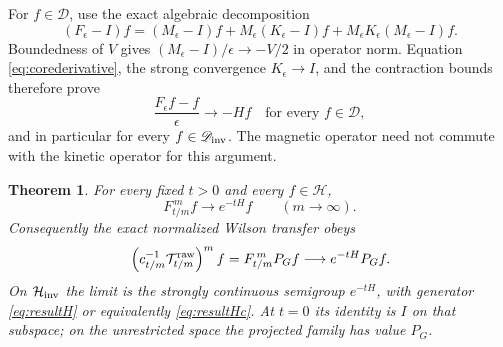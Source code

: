 \documentclass[11pt]{article}
\newtheorem{theorem}{Theorem}
\begin{document}
For $f\in\mathscr D$, use the exact algebraic decomposition
\[
 (F_\epsilon-I)f=(M_\epsilon-I)f
    +M_\epsilon(K_\epsilon-I)f
    +M_\epsilon K_\epsilon(M_\epsilon-I)f.
\]
Boundedness of $V$ gives
$(M_\epsilon-I)/\epsilon\to-V/2$ in operator norm. Equation
\eqref{eq:corederivative}, the strong convergence $K_\epsilon\to I$,
and the contraction bounds therefore prove
\begin{equation}\label{eq:Fderivative}
 \frac{F_\epsilon f-f}{\epsilon}\longrightarrow-Hf
 \quad\text{for every }f\in\mathscr D,
\end{equation}
and in particular for every $f\in\mathscr D_{\rm inv}$. The magnetic
operator need not commute with the kinetic operator for this argument.

\begin{theorem}\label{thm:stronglimit}
For every fixed $t>0$ and every $f\in\mathcal H$,
\begin{equation}\label{eq:stronglimit}
 F_{t/m}^{\,m}f\longrightarrow e^{-tH}f
 \qquad(m\longrightarrow\infty).
\end{equation}
Consequently the exact normalized Wilson transfer obeys
\begin{equation}\label{eq:projectedlimit}
 \left(c_{t/m}^{-1}\mathcal T_{t/m}^{\rm raw}\right)^mf
 =F_{t/m}^{\,m}P_Gf\longrightarrow e^{-tH}P_Gf.
\end{equation}
On $\mathcal H_{\rm inv}$ the limit is the strongly continuous
semigroup $e^{-tH}$, with generator \eqref{eq:resultH} or equivalently
\eqref{eq:resultHc}. At $t=0$ its identity is $I$ on that subspace;
on the unrestricted space the projected family has value $P_G$.
\end{theorem}
\end{document}
